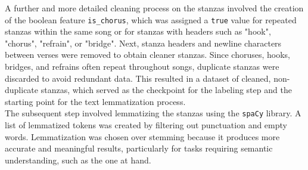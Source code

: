 A further and more detailed cleaning process on the stanzas involved the creation
of the boolean feature \texttt{is\_chorus}, which was assigned a \texttt{true}
value for repeated stanzas within the same song or for stanzas with headers such
as "hook", "chorus", "refrain", or "bridge".
Next, stanza headers and newline characters between verses were removed to obtain
cleaner stanzas.
Since choruses, hooks, bridges, and refrains often repeat throughout songs,
duplicate stanzas were discarded to avoid redundant data. This resulted in a
dataset of cleaned, non-duplicate stanzas, which served as the checkpoint for
the labeling step and the starting point for the text lemmatization process.\\

The subsequent step involved lemmatizing the stanzas using the \texttt{spaCy}
library. A list of lemmatized tokens was created by filtering out punctuation
and empty words. Lemmatization was chosen over stemming because it produces
more accurate and meaningful results, particularly for tasks requiring semantic
understanding, such as the one at hand.\\

